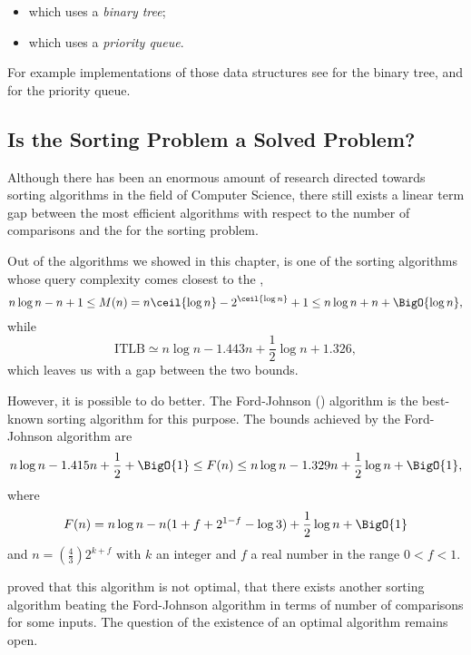 \begin{itemize}
\item \binarytreesort which uses a \emph{binary tree};
\item \tournamentsort which uses a \emph{priority queue}.
\end{itemize}

For example implementations of those data structures see
\citet*{sleator:1985} for the binary tree, and
\citet*{leiserson:2001} for the priority queue.


\subsection*{Is the Sorting Problem a Solved Problem?}

Although there has been an enormous amount of research directed towards sorting
algorithms in the field of Computer Science, there still exists a linear term
gap between the most efficient algorithms with respect to the number of
comparisons and the  for the sorting problem.

Out of the algorithms we showed in this chapter, \mergesort is one of the
sorting algorithms whose query complexity comes closest
to the , \ie
\begin{displaymath}
n \log n - n + 1 \le M(n) = n \ceil{\log n} - 2^{\ceil{\log n}} + 1 \le n \log
n + n + \BigO{\log n},
\end{displaymath}
while
\begin{displaymath}
\text{ITLB} \simeq n \log n - 1.443 n + \frac{1}{2} \log n + 1.326,
\end{displaymath}
which leaves us with a  gap between the two bounds.

However, it is possible to do better. The Ford-Johnson
(\cite{ford:1959,hwang:1969,knuth1998art}) algorithm is the
best-known sorting algorithm for this purpose. The bounds achieved by the
Ford-Johnson algorithm are
\begin{displaymath}
n \log n - 1.415 n + \frac{1}{2} + \BigO{1} \le F(n) \le n \log n - 1.329 n +
\frac{1}{2} \log n + \BigO{1},
\end{displaymath}
where
\begin{displaymath}
F(n) = n \log n - n ( 1 + f + 2^{1-f} - \log 3) + \frac{1}{2} \log n + \BigO{1}
\end{displaymath}
and \(n = \left(\frac{4}{3}\right) 2^{k+f}\) with \(k\) an integer and \(f\) a real
number in the range \(0 < f < 1\).

\citet*{manacher:1979} proved that this algorithm is not optimal, \ie that
there exists another sorting algorithm beating the Ford-Johnson algorithm in
terms of number of comparisons for some inputs. The question of the existence
of an optimal algorithm remains open.
